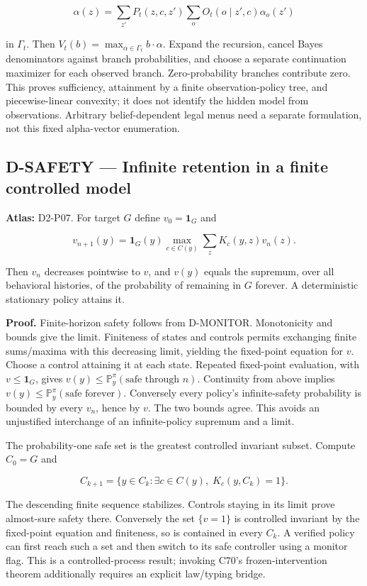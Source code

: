 \documentclass[
  11pt,
  a4paper,
]{article}
\begin{document}
\[\alpha(z)=\sum_{z'}P_t(z,c,z')\sum_oO_t(o\mid z',c)\alpha_o(z')\]

in \(\Gamma_t\). Then \(V_t(b)=\max_{\alpha\in\Gamma_t}b\cdot\alpha\).
Expand the recursion, cancel Bayes denominators against branch
probabilities, and choose a separate continuation maximizer for each
observed branch. Zero-probability branches contribute zero. This proves
sufficiency, attainment by a finite observation-policy tree, and
piecewise-linear convexity; it does not identify the hidden model from
observations. Arbitrary belief-dependent legal menus need a separate
formulation, not this fixed alpha-vector enumeration.

\subsection{D-SAFETY --- Infinite retention in a finite controlled
model}\label{d-safety-infinite-retention-in-a-finite-controlled-model}

\textbf{Atlas:} D2-P07. For target \(G\) define \(v_0=\mathbf1_G\) and

\[v_{n+1}(y)=\mathbf1_G(y)\max_{c\in C(y)}\sum_zK_c(y,z)v_n(z).\]

Then \(v_n\) decreases pointwise to \(v\), and \(v(y)\) equals the
supremum, over all behavioral histories, of the probability of remaining
in \(G\) forever. A deterministic stationary policy attains it.

\textbf{Proof.} Finite-horizon safety follows from D-MONITOR.
Monotonicity and bounds give the limit. Finiteness of states and
controls permits exchanging finite sums/maxima with this decreasing
limit, yielding the fixed-point equation for \(v\). Choose a control
attaining it at each state. Repeated fixed-point evaluation, with
\(v\le\mathbf1_G\), gives
\(v(y)\le\mathbb P_y^\pi(\text{safe through }n)\). Continuity from above
implies \(v(y)\le\mathbb P_y^\pi(\text{safe forever})\). Conversely
every policy's infinite-safety probability is bounded by every \(v_n\),
hence by \(v\). The two bounds agree. This avoids an unjustified
interchange of an infinite-policy supremum and a limit.

The probability-one safe set is the greatest controlled invariant
subset. Compute \(C_0=G\) and

\[C_{k+1}=\{y\in C_k:\exists c\in C(y),\;K_c(y,C_k)=1\}.\]

The descending finite sequence stabilizes. Controls staying in its limit
prove almost-sure safety there. Conversely the set \(\{v=1\}\) is
controlled invariant by the fixed-point equation and finiteness, so is
contained in every \(C_k\). A verified policy can first reach such a set
and then switch to its safe controller using a monitor flag. This is a
controlled-process result; invoking C70's frozen-intervention theorem
additionally requires an explicit law/typing bridge.
\end{document}
